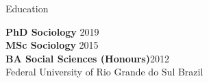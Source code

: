 \begin{rSection}{Education}

{\bf PhD Sociology} \hfill {2019} \\
{\bf MSc Sociology} \hfill {2015} \\
{\bf BA Social Sciences (Honours)}\hfill {2012}\\
{Federal University of Rio Grande do Sul} \hfill {Brazil}

\end{rSection}